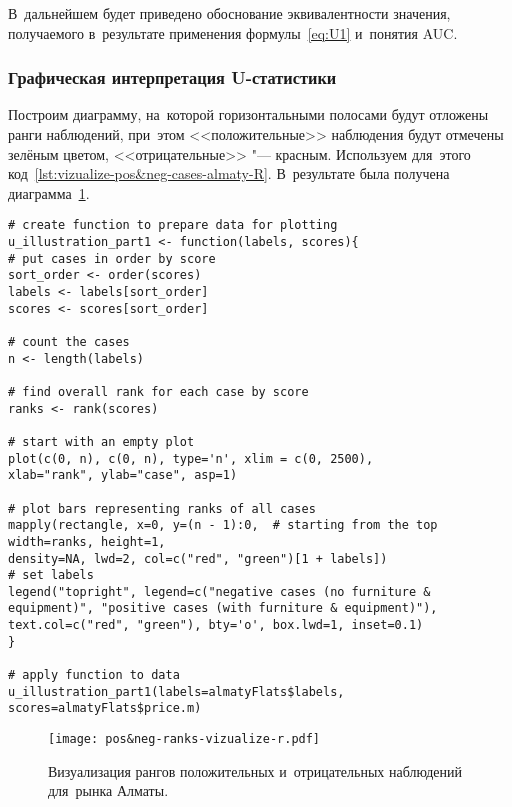 \documentclass[]{scrreprt}
\begin{document}
В~дальнейшем будет приведено обоснование эквивалентности значения, получаемого в~результате применения формулы~\ref{eq:U1} и~понятия AUC.
%
\subsubsection{Графическая интерпретация U-статистики}
Построим диаграмму, на~которой горизонтальными полосами будут отложены ранги наблюдений, при~этом <<положительные>> наблюдения будут отмечены зелёным цветом, <<отрицательные>> "--- красным. Используем для~этого код~\ref{lst:vizualize-pos&neg-cases-almaty-R}. В~результате была получена диаграмма~\ref{fig:pos&neg-ranks-vizualize-r.pdf}.
%
\begin{lstlisting}[float, caption = Визуализация рангов положительных и~отрицательных наблюдений для~рынка Алматы, firstnumber=1, label= lst:vizualize-pos&neg-cases-almaty-R]
# create function to prepare data for plotting
u_illustration_part1 <- function(labels, scores){
# put cases in order by score
sort_order <- order(scores)
labels <- labels[sort_order]
scores <- scores[sort_order]

# count the cases
n <- length(labels)

# find overall rank for each case by score
ranks <- rank(scores)

# start with an empty plot
plot(c(0, n), c(0, n), type='n', xlim = c(0, 2500),
xlab="rank", ylab="case", asp=1)

# plot bars representing ranks of all cases
mapply(rectangle, x=0, y=(n - 1):0,  # starting from the top 
width=ranks, height=1, 
density=NA, lwd=2, col=c("red", "green")[1 + labels])
# set labels   
legend("topright", legend=c("negative cases (no furniture & equipment)", "positive cases (with furniture & equipment)"), 
text.col=c("red", "green"), bty='o', box.lwd=1, inset=0.1)
}

# apply function to data
u_illustration_part1(labels=almatyFlats$labels, scores=almatyFlats$price.m)
\end{lstlisting}
%
\begin{figure}[ht]
	\centering
	\texttt{[image: pos\&neg-ranks-vizualize-r.pdf]}
	\caption{Визуализация рангов положительных и~отрицательных наблюдений для~рынка Алматы.}
	\label{fig:pos&neg-ranks-vizualize-r.pdf}
\end{figure}
%
\end{document}
